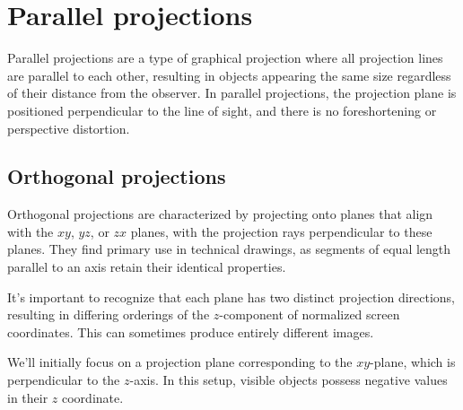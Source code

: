 \section{Parallel projections}

Parallel projections are a type of graphical projection where all projection lines are parallel to each other, resulting in objects appearing the same size regardless of their distance from the observer. 
In parallel projections, the projection plane is positioned perpendicular to the line of sight, and there is no foreshortening or perspective distortion.

\subsection{Orthogonal projections}
Orthogonal projections are characterized by projecting onto planes that align with the $xy$, $yz$, or $zx$ planes, with the projection rays perpendicular to these planes. 
They find primary use in technical drawings, as segments of equal length parallel to an axis retain their identical properties.

It's important to recognize that each plane has two distinct projection directions, resulting in differing orderings of the $z$-component of normalized screen coordinates. 
This can sometimes produce entirely different images.

We'll initially focus on a projection plane corresponding to the $xy$-plane, which is perpendicular to the $z$-axis.
In this setup, visible objects possess negative values in their $z$ coordinate.

